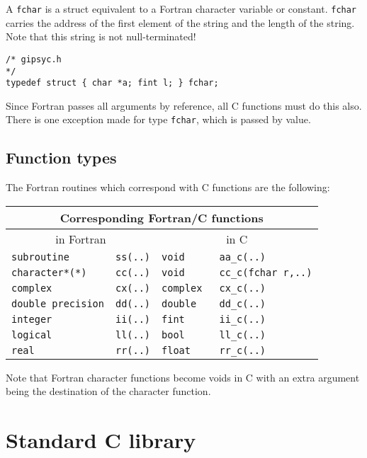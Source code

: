 A {\tt fchar} is a struct equivalent to a Fortran character variable or
constant. {\tt fchar} carries the address of the first element of the
string and the length of the string. Note that this string is not
null-terminated! 

\begin{verbatim}
/* gipsyc.h
*/
typedef struct { char *a; fint l; } fchar;
\end{verbatim}

Since Fortran passes all arguments by reference, all C functions must do
this also. There is one exception made for type {\tt fchar}, which is
passed by value.

\subsection{Function types}

The Fortran routines which correspond with C functions are the
following: 

\begin{center}
\begin{tabular}{|l l|l l|}
\hline
\multicolumn{4}{|c|}{Corresponding Fortran/C functions}\\
\hline
\multicolumn{2}{|c|}{in Fortran}&\multicolumn{2}{|c|}{in C}\\
\hline
{\tt subroutine      }&{\tt ss(..)}&{\tt void    }&{\tt aa\_c(..)        }\\
{\tt character*(*)   }&{\tt cc(..)}&{\tt void    }&{\tt cc\_c(fchar r,..)}\\
{\tt complex         }&{\tt cx(..)}&{\tt complex }&{\tt cx\_c(..)        }\\
{\tt double precision}&{\tt dd(..)}&{\tt double  }&{\tt dd\_c(..)        }\\
{\tt integer         }&{\tt ii(..)}&{\tt fint    }&{\tt ii\_c(..)        }\\
{\tt logical         }&{\tt ll(..)}&{\tt bool    }&{\tt ll\_c(..)        }\\
{\tt real            }&{\tt rr(..)}&{\tt float   }&{\tt rr\_c(..)        }\\
\hline
\end{tabular}
\end{center}

Note that Fortran character functions become voids in C with an extra
argument being the destination of the character function.

\section{Standard C library}

